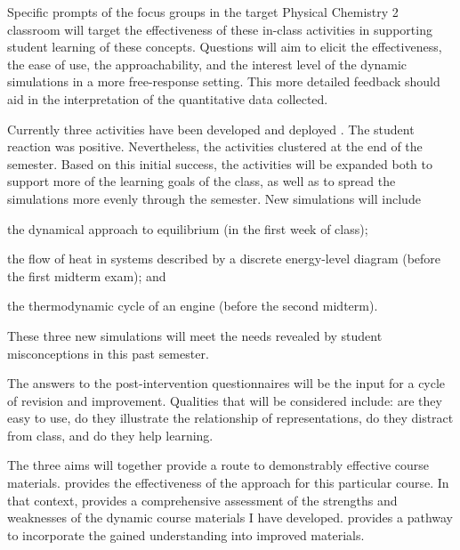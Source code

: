 \documentclass[10pt,letterpaper]{article}
\begin{document}
 Specific prompts of the focus groups in the target Physical Chemistry 2 classroom will target the effectiveness of these in-class activities in supporting student learning of these concepts. Questions will aim to elicit the effectiveness, the ease of use, the approachability, and the interest level of the dynamic simulations in a more free-response setting. This more detailed feedback should aid in the interpretation of the quantitative data collected.




\label{aim:refine}
Currently three activities have been developed and deployed . The student reaction was positive. Nevertheless, the activities clustered at the end of the semester. Based on this initial success, the activities will be expanded both to support more of the learning goals of the class, as well as to spread the simulations more evenly through the semester. New simulations will include 
\begin{enumerate*}[label=\textbf{\arabic*)}]
\item the dynamical approach to equilibrium (in the first week of class);
\item the flow of heat in systems described by a discrete energy-level diagram (before the first midterm exam); and
\item the thermodynamic cycle of an engine (before the second midterm).
\end{enumerate*}
These three new simulations will meet the needs revealed by student misconceptions in this past semester.

The answers to the post-intervention questionnaires  will be the input for a cycle of revision and improvement. Qualities that will be considered include: are they easy to use, do they illustrate the relationship of representations, do they distract from class, and do they help learning. 


The three aims will together provide a route to demonstrably effective course materials.  provides the effectiveness of the \pogil approach for this particular course. In that context,  provides a comprehensive assessment of the strengths and weaknesses of the dynamic course materials I have developed.  provides a pathway to incorporate the gained understanding into improved materials.
\end{document}
